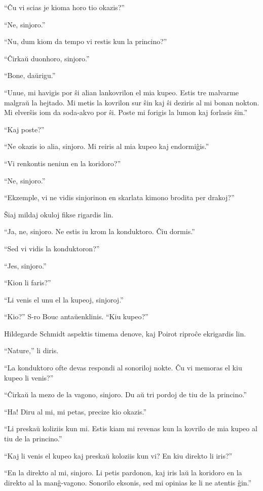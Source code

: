 ``Ĉu vi scias je kioma horo tio okazis?''

``Ne, sinjoro.''

``Nu, dum kiom da tempo vi restis kun la princino?''

``Ĉirkaŭ duonhoro, sinjoro.''

``Bone, daŭrigu.''

``Unue, mi havigis por ŝi alian lankovrilon el mia kupeo. Estis tre malvarme malgraŭ la hejtado. Mi metis la kovrilon sur ŝin kaj ŝi deziris al mi bonan nokton. Mi elverŝis iom da soda-akvo por ŝi. Poste mi forigis la lumon kaj forlasis ŝin.''

``Kaj poste?''

``Ne okazis io alia, sinjoro. Mi reiris al mia kupeo kaj endormiĝis.''

``Vi renkontis neniun en la koridoro?''

``Ne, sinjoro.''

``Ekzemple, vi ne vidis sinjorinon en skarlata kimono brodita per drakoj?''

Ŝiaj mildaj okuloj fikse rigardis lin.

``Ja, ne, sinjoro. Ne estis iu krom la konduktoro. Ĉiu dormis.''

``Sed vi vidis la konduktoron?''

``Jes, sinjoro.''

``Kion li faris?''

``Li venis el unu el la kupeoj, sinjoroj.''

``Kio?'' S-ro Bouc antaŭenklinis. ``Kiu kupeo?''

Hildegarde Schmidt aspektis timema denove, kaj Poirot riproĉe ekrigardis lin.

``Nature,'' li diris.

``La konduktoro ofte devas respondi al sonoriloj nokte. Ĉu vi memoras el kiu kupeo li venis?''

``Ĉirkaŭ la mezo de la vagono, sinjoro. Du aŭ tri pordoj de tiu de la princino.''

``Ha! Diru al mi, mi petas, precize kio okazis.''

``Li preskaŭ koliziis kun mi. Estis kiam mi revenas kun la kovrilo de mia kupeo al tiu de la princino.''

``Kaj li venis el kupeo kaj preskaŭ koloziis kun vi? En kiu direkto li iris?''

``En la direkto al mi, sinjoro. Li petis pardonon, kaj iris laŭ la koridoro en la direkto al la manĝ-vagono. Sonorilo eksonis, sed mi opinias ke li ne atentis ĝin.''

